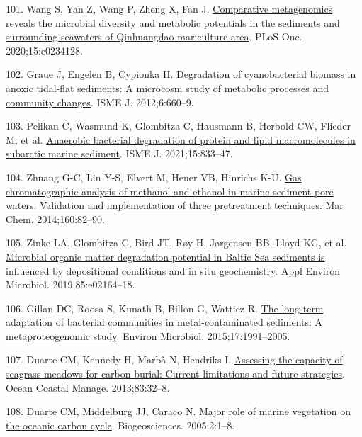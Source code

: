 \documentclass[
  12 pt,
]{article}
\newlength{\cslhangindent}
\newlength{\cslentryspacingunit} %
\newenvironment{CSLReferences}[2] %
 {%
  \setlength{\parindent}{0pt}
  \ifodd #1
  \let\oldpar\par
  \def\par{\hangindent=\cslhangindent\oldpar}
  \fi
  \setlength{\parskip}{#2\cslentryspacingunit}
 }%
 {}
\begin{document}
\begin{CSLReferences}{0}{0}
\leavevmode{}%
101. Wang S, Yan Z, Wang P, Zheng X, Fan J. \href{https://doi.org/10.1371/journal.pone.0234128}{Comparative metagenomics reveals the microbial diversity and metabolic potentials in the sediments and surrounding seawaters of {Qinhuangdao} mariculture area}. PLoS One. 2020;15:e0234128.

\leavevmode{}%
102. Graue J, Engelen B, Cypionka H. \href{https://doi.org/10.1038/ismej.2011.120}{Degradation of cyanobacterial biomass in anoxic tidal-flat sediments: A microcosm study of metabolic processes and community changes}. ISME J. 2012;6:660--9.

\leavevmode{}%
103. Pelikan C, Wasmund K, Glombitza C, Hausmann B, Herbold CW, Flieder M, et al. \href{https://doi.org/10.1038/s41396-020-00817-6}{Anaerobic bacterial degradation of protein and lipid macromolecules in subarctic marine sediment}. ISME J. 2021;15:833--47.

\leavevmode{}%
104. Zhuang G-C, Lin Y-S, Elvert M, Heuer VB, Hinrichs K-U. \href{https://doi.org/10.1016/j.marchem.2014.01.011}{Gas chromatographic analysis of methanol and ethanol in marine sediment pore waters: Validation and implementation of three pretreatment techniques}. Mar Chem. 2014;160:82--90.

\leavevmode{}%
105. Zinke LA, Glombitza C, Bird JT, Røy H, Jørgensen BB, Lloyd KG, et al. \href{https://doi.org/10.1128/AEM.02164-18}{Microbial organic matter degradation potential in {Baltic Sea} sediments is influenced by depositional conditions and in situ geochemistry}. Appl Environ Microbiol. 2019;85:e02164--18.

\leavevmode{}%
106. Gillan DC, Roosa S, Kunath B, Billon G, Wattiez R. \href{https://doi.org/10.1111/1462-2920.12627}{The long-term adaptation of bacterial communities in metal-contaminated sediments: A metaproteogenomic study}. Environ Microbiol. 2015;17:1991--2005.

\leavevmode{}%
107. Duarte CM, Kennedy H, Marbà N, Hendriks I. \href{https://doi.org/10.1016/j.ocecoaman.2011.09.001}{Assessing the capacity of seagrass meadows for carbon burial: Current limitations and future strategies}. Ocean Coastal Manage. 2013;83:32--8.

\leavevmode{}%
108. Duarte CM, Middelburg JJ, Caraco N. \href{https://doi.org/10.5194/bg-2-1-2005}{Major role of marine vegetation on the oceanic carbon cycle}. Biogeosciences. 2005;2:1--8.


\end{CSLReferences}
\end{document}
